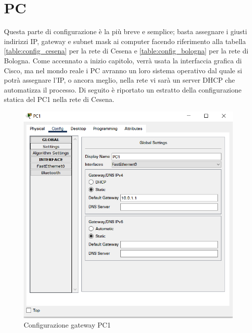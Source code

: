 \documentclass[a4paper,12pt]{report}
\begin{document}
\section{PC}
Questa parte di configurazione è la più breve e semplice; basta assegnare i giusti indirizzi IP, gateway e subnet mask ai computer facendo riferimento alla tabella \ref{table:config_cesena} per la rete di Cesena e \ref{table:config_bologna} per la rete di Bologna.
%
Come accennato a inizio capitolo, verrà usata la interfaccia grafica di Cisco, ma nel mondo reale i PC avranno un loro sistema operativo dal quale si potrà assegnare l'IP, o ancora meglio, nella rete vi sarà un server DHCP che automatizza il processo.
%
Di seguito è riportato un estratto della configurazione statica del PC1 nella rete di Cesena.
\begin{figure}[H]
\includegraphics[]{pc1_gateway_config.png}
\caption{Configurazione gateway PC1}
\label{fig:pc1_gateway_config}
\end{figure}
\end{document}
